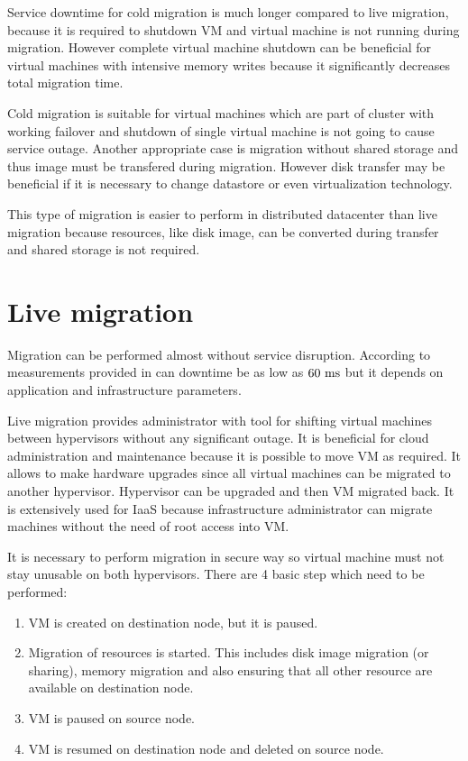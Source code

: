 Service downtime for cold migration is much longer compared to live migration, because it is required to shutdown \Ac{VM} and virtual machine is not running during migration. However complete virtual machine shutdown can be beneficial for virtual machines with intensive memory writes because it significantly decreases total migration time. 

Cold migration is suitable for virtual machines which are part of cluster with working failover and shutdown of single virtual machine is not going to cause service outage. Another appropriate case is migration without shared storage and thus image must be transfered during migration. However disk transfer may be beneficial if it is necessary to change datastore or even virtualization technology.

This type of migration is easier to perform in distributed datacenter than live migration because resources, like disk image, can be converted during transfer and shared storage is not required.


\section{Live migration}

Migration can be performed  almost without service disruption. According to measurements provided in \cite{live-migration-of-vms} can downtime be as low as $60~\mathrm{ms}$ but it depends on application and infrastructure parameters.

Live migration provides administrator with tool for shifting virtual machines between hypervisors without any significant outage. It is beneficial for cloud administration and maintenance because it is possible to move \Ac{VM} as required. It allows to make hardware upgrades since all virtual machines can be migrated to another hypervisor. Hypervisor can be upgraded and then \Ac{VM} migrated back. 
It is extensively used for \Ac{IaaS} because infrastructure administrator can migrate machines without the need of root access into \Ac{VM}. 

It is necessary to perform migration in secure way so virtual machine must not stay unusable on both hypervisors. There are 4 basic step which need to be performed:
\begin{enumerate}
	\item \Ac{VM} is created on destination node, but it is paused.
	\item Migration of resources is started. This includes disk image migration (or sharing), memory migration and also ensuring that all other resource are available on destination node.
	\item \Ac{VM} is paused on source node.
	\item \Ac{VM} is resumed on destination node and deleted on source node.
\end{enumerate}

